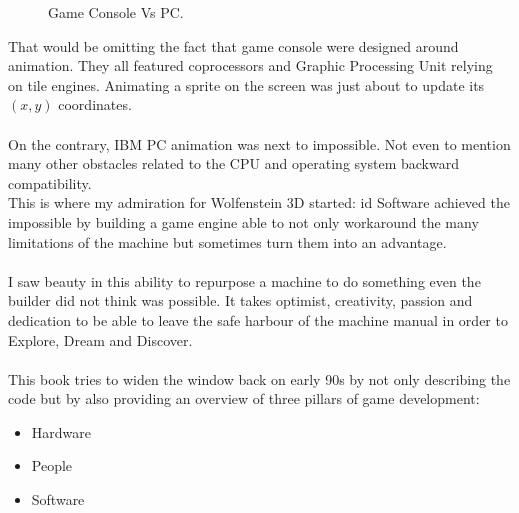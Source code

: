 \begin{figure}[H]
\centering
   \caption{Game Console Vs PC.} \label{fig:game_console_vs_PC}
 \end{figure}
 
That would be omitting the fact that game console were designed around animation. They all featured coprocessors and Graphic Processing Unit relying on tile engines. Animating a sprite on the screen was just about to update its $(x,y)$ coordinates.\\
\\
On the contrary, IBM PC animation was next to impossible. Not even to mention many other obstacles related to the CPU and operating system backward compatibility.\\ This is where my admiration for Wolfenstein 3D started: id Software achieved the impossible by building a game engine able to not only workaround the many limitations of the machine but sometimes turn them into an advantage.\\
\\
I saw beauty in this ability to repurpose a machine to do something even the builder did not think was possible. It takes optimist, creativity, passion and dedication to be able to leave the safe harbour of the machine manual in order to Explore, Dream and Discover.\\
\\
This book tries to widen the window back on early 90s by not only describing the code but by also providing an overview of three pillars of game development:\\
\begin{itemize}
\item Hardware
\item People
\item Software
\end{itemize}

